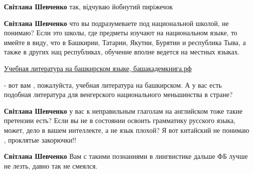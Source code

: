 \begin{itemize}
\begin{itemize}
 
\textbf{Світлана Шевченко} так, відчуваю йобнутий пиріжечок

 
\textbf{Світлана Шевченко} что вы подразумеваете под национальной школой, не
понимаю? Если это школы, где предметы изучают на национальном языке, то имейте
в виду, что в Башкирии, Татарии, Якутии, Бурятии и республика Тыва, а также в
других нац республиках, обучение вполне ведется на местных языках.

\href{http://башакадемкнига.рф/catalog/uchebnaya-literatura-na-bashkirskom-yazyke}{%
Учебная литература на башкирском языке, башакадемкнига.рф%
}

- вот вам , пожалуйста, учебная литература на башкирском. А у вас есть подобная
литература для венгерского национального меньшинства в стране?

 
\textbf{Світлана Шевченко} у вас к неправильным глаголам на английском тоже
такие претензии есть? Если вы не в состоянии освоить грамматику русского языка,
может, дело в вашем интеллекте, а не язык плохой? Я вот китайский не понимаю ,
проклятые закорючки!!

 
\textbf{Світлана Шевченко} Вам с такими познаниями в лингвистике дальше ФБ лучше не лезть, давно так не смеялся.

 

\end{itemize}
\end{itemize}
